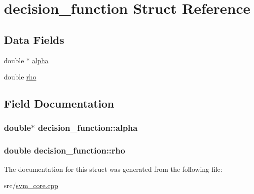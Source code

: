 \hypertarget{structdecision__function}{}\section{decision\+\_\+function Struct Reference}
\label{structdecision__function}
\subsection*{Data Fields}
\begin{DoxyCompactItemize}
\item 
double $\ast$ \hyperlink{structdecision__function_ab79ad1c39d091d4f8ad798abe4223772}{alpha}
\item 
double \hyperlink{structdecision__function_ae2aeeaa508803351b22d4454b81cb375}{rho}
\end{DoxyCompactItemize}


\subsection{Field Documentation}
\subsubsection[{alpha}]{\setlength{\rightskip}{0pt plus 5cm}double$\ast$ decision\+\_\+function\+::alpha}\hypertarget{structdecision__function_ab79ad1c39d091d4f8ad798abe4223772}{}\label{structdecision__function_ab79ad1c39d091d4f8ad798abe4223772}
\subsubsection[{rho}]{\setlength{\rightskip}{0pt plus 5cm}double decision\+\_\+function\+::rho}\hypertarget{structdecision__function_ae2aeeaa508803351b22d4454b81cb375}{}\label{structdecision__function_ae2aeeaa508803351b22d4454b81cb375}


The documentation for this struct was generated from the following file\+:\begin{DoxyCompactItemize}
\item 
src/\hyperlink{svm__core_8cpp}{svm\+\_\+core.\+cpp}\end{DoxyCompactItemize}
